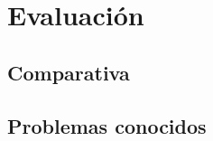 \chapter{Evaluación}
\label{chap:evaluation}
\vspace{0.5cm}


 

\section{Comparativa}


\section{Problemas conocidos}
\label{sec:known_issues}
    

